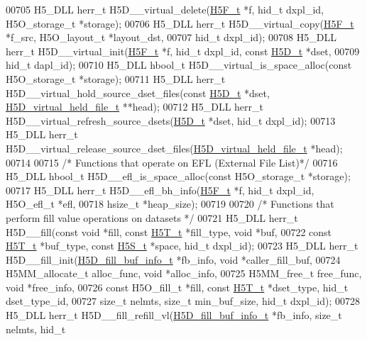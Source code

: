 \begin{DoxyCode}
00705 H5\_DLL herr\_t H5D\_\_virtual\_delete(\hyperlink{struct_h5_f__t}{H5F\_t} *f, hid\_t dxpl\_id, H5O\_storage\_t *storage);
00706 H5\_DLL herr\_t H5D\_\_virtual\_copy(\hyperlink{struct_h5_f__t}{H5F\_t} *f\_src, H5O\_layout\_t *layout\_dst,
00707     hid\_t dxpl\_id);
00708 H5\_DLL herr\_t H5D\_\_virtual\_init(\hyperlink{struct_h5_f__t}{H5F\_t} *f, hid\_t dxpl\_id, \textcolor{keyword}{const} \hyperlink{struct_h5_d__t}{H5D\_t} *dset,
00709     hid\_t dapl\_id);
00710 H5\_DLL hbool\_t H5D\_\_virtual\_is\_space\_alloc(\textcolor{keyword}{const} H5O\_storage\_t *storage);
00711 H5\_DLL herr\_t H5D\_\_virtual\_hold\_source\_dset\_files(\textcolor{keyword}{const} \hyperlink{struct_h5_d__t}{H5D\_t} *dset, 
      \hyperlink{struct_h5_d__virtual__held__file__t}{H5D\_virtual\_held\_file\_t} **head);
00712 H5\_DLL herr\_t H5D\_\_virtual\_refresh\_source\_dsets(\hyperlink{struct_h5_d__t}{H5D\_t} *dset, hid\_t dxpl\_id);
00713 H5\_DLL herr\_t H5D\_\_virtual\_release\_source\_dset\_files(\hyperlink{struct_h5_d__virtual__held__file__t}{H5D\_virtual\_held\_file\_t} *head);
00714 
00715 \textcolor{comment}{/* Functions that operate on EFL (External File List)*/}
00716 H5\_DLL hbool\_t H5D\_\_efl\_is\_space\_alloc(\textcolor{keyword}{const} H5O\_storage\_t *storage);
00717 H5\_DLL herr\_t H5D\_\_efl\_bh\_info(\hyperlink{struct_h5_f__t}{H5F\_t} *f, hid\_t dxpl\_id, H5O\_efl\_t *efl,
00718     hsize\_t *heap\_size);
00719 
00720 \textcolor{comment}{/* Functions that perform fill value operations on datasets */}
00721 H5\_DLL herr\_t H5D\_\_fill(\textcolor{keyword}{const} \textcolor{keywordtype}{void} *fill, \textcolor{keyword}{const} \hyperlink{struct_h5_t__t}{H5T\_t} *fill\_type, \textcolor{keywordtype}{void} *buf,
00722     \textcolor{keyword}{const} \hyperlink{struct_h5_t__t}{H5T\_t} *buf\_type, \textcolor{keyword}{const} \hyperlink{struct_h5_s__t}{H5S\_t} *space, hid\_t dxpl\_id);
00723 H5\_DLL herr\_t H5D\_\_fill\_init(\hyperlink{struct_h5_d__fill__buf__info__t}{H5D\_fill\_buf\_info\_t} *fb\_info, \textcolor{keywordtype}{void} *caller\_fill\_buf,
00724     H5MM\_allocate\_t alloc\_func, \textcolor{keywordtype}{void} *alloc\_info,
00725     H5MM\_free\_t free\_func, \textcolor{keywordtype}{void} *free\_info,
00726     \textcolor{keyword}{const} H5O\_fill\_t *fill, \textcolor{keyword}{const} \hyperlink{struct_h5_t__t}{H5T\_t} *dset\_type, hid\_t dset\_type\_id,
00727     \textcolor{keywordtype}{size\_t} nelmts, \textcolor{keywordtype}{size\_t} min\_buf\_size, hid\_t dxpl\_id);
00728 H5\_DLL herr\_t H5D\_\_fill\_refill\_vl(\hyperlink{struct_h5_d__fill__buf__info__t}{H5D\_fill\_buf\_info\_t} *fb\_info, \textcolor{keywordtype}{size\_t} nelmts, hid\_t 

\end{DoxyCode}
